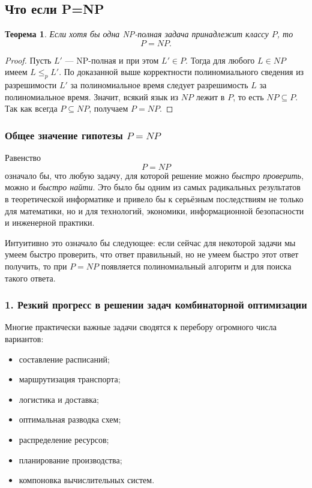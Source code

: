 \documentclass[12pt,a4paper]{article}
\theoremstyle{definition}
\theoremstyle{plain}
\newtheorem{theorem}{Теорема}[section]
\begin{document}
\subsection{Что если P=NP}
\begin{theorem}
Если хотя бы одна NP-полная задача принадлежит классу $P$, то
\[
P=NP.
\]
\end{theorem}

\begin{proof}
Пусть $L'$ --- NP-полная и при этом $L'\in P$. Тогда для любого $L\in NP$ имеем $L\le_p L'$. По доказанной выше корректности полиномиального сведения из разрешимости $L'$ за полиномиальное время следует разрешимость $L$ за полиномиальное время. Значит, всякий язык из $NP$ лежит в $P$, то есть $NP\subseteq P$. Так как всегда $P\subseteq NP$, получаем $P=NP$.
\end{proof}

\subsubsection{Общее значение гипотезы \texorpdfstring{$P=NP$}{P=NP}}
Равенство
\[
P=NP
\]
означало бы, что любую задачу, для которой решение можно \textit{быстро проверить}, можно и \textit{быстро найти}. Это было бы одним из самых радикальных результатов в теоретической информатике и привело бы к серьёзным последствиям не только для математики, но и для технологий, экономики, информационной безопасности и инженерной практики.

Интуитивно это означало бы следующее: если сейчас для некоторой задачи мы умеем быстро проверить, что ответ правильный, но не умеем быстро этот ответ получить, то при $P=NP$ появляется полиномиальный алгоритм и для поиска такого ответа.

\subsubsection{1. Резкий прогресс в решении задач комбинаторной оптимизации}
Многие практически важные задачи сводятся к перебору огромного числа вариантов:
\begin{itemize}
\item составление расписаний;
\item маршрутизация транспорта;
\item логистика и доставка;
\item оптимальная разводка схем;
\item распределение ресурсов;
\item планирование производства;
\item компоновка вычислительных систем.
\end{itemize}
\end{document}
